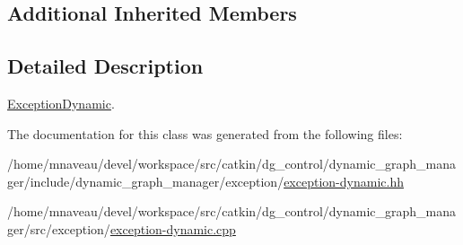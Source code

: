 \subsection*{Additional Inherited Members}


\subsection{Detailed Description}
\hyperlink{classdynamic__graph_1_1ExceptionDynamic}{Exception\+Dynamic}. 

The documentation for this class was generated from the following files\+:\begin{DoxyCompactItemize}
\item 
/home/mnaveau/devel/workspace/src/catkin/dg\+\_\+control/dynamic\+\_\+graph\+\_\+manager/include/dynamic\+\_\+graph\+\_\+manager/exception/\hyperlink{exception-dynamic_8hh}{exception-\/dynamic.\+hh}\item 
/home/mnaveau/devel/workspace/src/catkin/dg\+\_\+control/dynamic\+\_\+graph\+\_\+manager/src/exception/\hyperlink{exception-dynamic_8cpp}{exception-\/dynamic.\+cpp}\end{DoxyCompactItemize}
